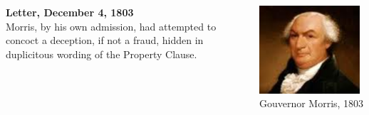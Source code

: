 \begin{frame}
    \begin{columns}[onlytextwidth]
            \textbf{Letter, December 4, 1803} \\
            Morris, by his own admission, had attempted to concoct a deception,
            if not a fraud, hidden in duplicitous wording of the Property
            Clause.

            \centering
            \includegraphics[width=0.95\textwidth]{img/morris-portrait.png} \\
            Gouvernor Morris, 1803 \\
    \end{columns}
\end{frame}

